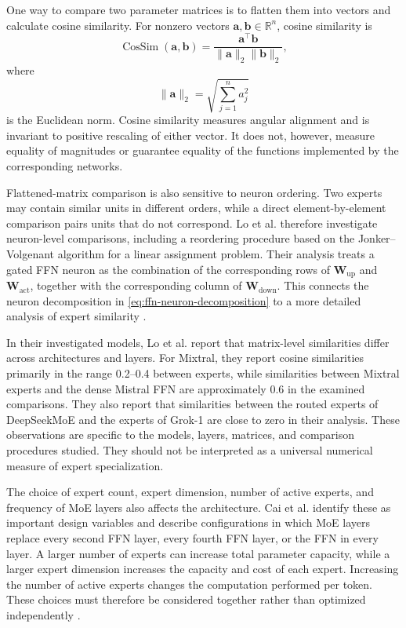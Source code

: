 One way to compare two parameter matrices is to flatten them into
vectors and calculate cosine similarity. For nonzero vectors
\(\mathbf{a},\mathbf{b}\in\mathbb{R}^{n}\), cosine similarity is
\begin{equation}
    \operatorname{CosSim}(\mathbf{a},\mathbf{b})
    =
    \frac{\mathbf{a}^{\top}\mathbf{b}}
    {\|\mathbf{a}\|_2\|\mathbf{b}\|_2},
    \label{eq:ffn-cosine-similarity}
\end{equation}
where
\[
    \|\mathbf{a}\|_2
    =
    \sqrt{\sum_{j=1}^{n}a_j^2}
\]
is the Euclidean norm. Cosine similarity measures angular alignment
and is invariant to positive rescaling of either vector. It does not,
however, measure equality of magnitudes or guarantee equality of
the functions implemented by the corresponding networks.

Flattened-matrix comparison is also sensitive to neuron ordering.
Two experts may contain similar units in different orders, while a
direct element-by-element comparison pairs units that do not
correspond. Lo et al. therefore investigate neuron-level comparisons,
including a reordering procedure based on the Jonker--Volgenant
algorithm for a linear assignment problem. Their analysis treats a
gated FFN neuron as the combination of the corresponding rows of
\(\mathbf{W}_{\mathrm{up}}\) and \(\mathbf{W}_{\mathrm{act}}\), together
with the corresponding column of \(\mathbf{W}_{\mathrm{down}}\).
This connects the neuron decomposition in
\cref{eq:ffn-neuron-decomposition} to a more detailed analysis of
expert similarity \parencite{lo2025closer}.

In their investigated models, Lo et al. report that matrix-level
similarities differ across architectures and layers. For Mixtral,
they report cosine similarities primarily in the range 0.2--0.4
between experts, while similarities between Mixtral experts and the
dense Mistral FFN are approximately 0.6 in the examined comparisons.
They also report that similarities between the routed experts of
DeepSeekMoE and the experts of Grok-1 are close to zero in their
analysis. These observations are specific to the models, layers,
matrices, and comparison procedures studied. They should not be
interpreted as a universal numerical measure of expert
specialization.

The choice of expert count, expert dimension, number of active
experts, and frequency of MoE layers also affects the architecture.
Cai et al. identify these as important design variables and describe
configurations in which MoE layers replace every second FFN layer,
every fourth FFN layer, or the FFN in every layer. A larger number
of experts can increase total parameter capacity, while a larger
expert dimension increases the capacity and cost of each expert.
Increasing the number of active experts changes the computation
performed per token. These choices must therefore be considered
together rather than optimized independently
\parencite{cai2025survey}.

